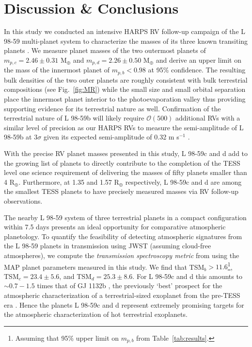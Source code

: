 \documentclass[longauth]{aa}
\newcommand{\mps}{m s$^{-1}$}
\begin{document}
\section{Discussion \& Conclusions}
\label{sec:conclusion}
In this study we conducted an intensive HARPS RV follow-up campaign of the L 98-59 multi-planet system to characterize the masses of its three known transiting planets . We measure planet masses of the two outermost planets of $m_{p,c}=2.46\pm 0.31$ M$_{\oplus}$ and $m_{p,d}=2.26\pm 0.50$ M$_{\oplus}$ and derive an upper limit on the mass of the innermost planet of $m_{p,b}<0.98$ at 95\% confidence. The resulting bulk densities of the two outer planets are roughly consistent with bulk terrestrial compositions (see Fig.~\ref{fig:MR}) while the small size and small orbital separation place the innermost planet interior to the photoevaporation valley \citep{owen13,jin14,lopez14,chen16,lopez16,owen17} thus providing supporting evidence for its terrestrial nature as well. Confirmation of the terrestrial nature of L 98-59b will likely require $\mathcal{O}(500)$ additional RVs with a similar level of precision as our HARPS RVs to measure the semi-amplitude of L 98-59b at $3\sigma$ \citep{cloutier18b} given its expected semi-amplitude of 0.32 \mps{} \citep{chen17}. 

With the precise RV planet masses presented in this study, L 98-59c and d add to the growing list of planets to directly contribute to the completion of the TESS level one science requirement of delivering the masses of fifty planets smaller than 4 R$_{\oplus}$. Furthermore, at 1.35 and 1.57 R$_{\oplus}$ respectively, L 98-59c and d are among the smallest TESS planets to have precisely measured masses via RV  follow-up observations.

The nearby L 98-59 system of three terrestrial planets in a compact configuration within 7.5 days presents an ideal opportunity for comparative atmospheric planetology. To quantify the feasibility of detecting atmospheric signatures from the L 98-59 planets in transmission using JWST (assuming cloud-free atmospheres), we compute the \emph{transmission spectroscopy metric} from \cite{kempton18} using the MAP planet parameters measured in this study. We find that TSM$_b > 11.6$\footnote{Assuming that 95\% upper limit on $m_{p,b}$ from Table~\ref{tab:results}.}, TSM$_c=23.4\pm 5.6$, and TSM$_d=25.3\pm 8.6$. For L 98-59c and d this amounts to $\sim 0.7-1.5$ times that of GJ 1132b \citep{dittmann17a,bonfils18}, the previously `best' prospect for the atmospheric characterization of a terrestrial-sized exoplanet from the pre-TESS era \citep{morley17}. Hence the planets L 98-59c and d represent extremely promising targets for the atmospheric characterization of hot terrestrial exoplanets.
\end{document}
